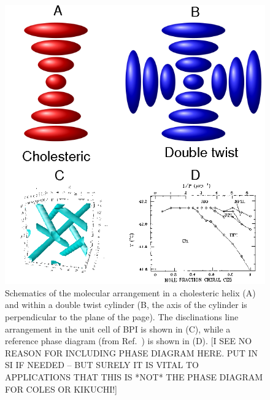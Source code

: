 \documentclass[12pt]{article}
\begin{document}
\begin{figure}
\includegraphics[width=\textwidth]{s0.png}
\caption{Schematics of the molecular arrangement in a 
cholesteric helix (A) and within a double twist cylinder (B, the
axis of the cylinder is perpendicular to the plane of the page).
The disclinations line arrangement in the unit cell of BPI is shown in
(C), while a reference phase diagram (from Ref.~\cite{crooker}) is
shown in (D). [I SEE NO REASON FOR INCLUDING PHASE DIAGRAM HERE. PUT IN SI IF NEEDED -- BUT SURELY IT IS VITAL TO APPLICATIONS THAT THIS IS *NOT* THE PHASE DIAGRAM FOR COLES OR KIKUCHI!]}
\end{figure}
\end{document}
